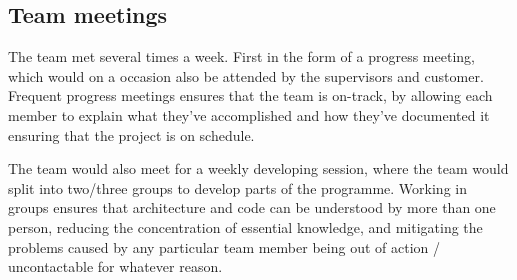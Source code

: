 \subsection{Team meetings}

The team met several times a week. First in the form of a progress meeting, which would on a occasion also be attended by the supervisors and customer. Frequent progress meetings ensures that the team is on-track, by allowing each member to explain what they've accomplished and how they've documented it ensuring that the project is on schedule.
 
The team would also meet for a weekly developing session, where the team would split into two/three groups to develop parts of the programme. Working in groups ensures that architecture and code can be understood by more than one person, reducing the concentration of essential knowledge, and mitigating the problems caused by any particular team member being out of action / uncontactable for whatever reason.

